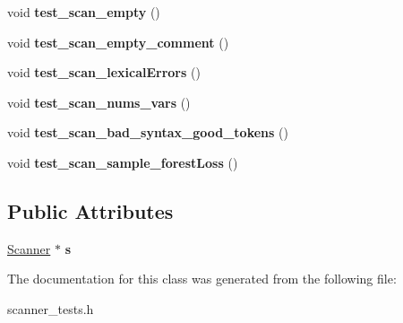 \begin{DoxyCompactItemize}
\item 
\hypertarget{classScannerTestSuite_a01beafb44a33f4d80baf9a4208919c07}{void {\bfseries test\-\_\-scan\-\_\-empty} ()}\label{classScannerTestSuite_a01beafb44a33f4d80baf9a4208919c07}

\item 
\hypertarget{classScannerTestSuite_a304719dd961df0714d372010cdf99ef1}{void {\bfseries test\-\_\-scan\-\_\-empty\-\_\-comment} ()}\label{classScannerTestSuite_a304719dd961df0714d372010cdf99ef1}

\item 
\hypertarget{classScannerTestSuite_af85168e66ba2b924488aca9768231367}{void {\bfseries test\-\_\-scan\-\_\-lexical\-Errors} ()}\label{classScannerTestSuite_af85168e66ba2b924488aca9768231367}

\item 
\hypertarget{classScannerTestSuite_a4bd4d5fc2218f3d28b08b2821ecc271b}{void {\bfseries test\-\_\-scan\-\_\-nums\-\_\-vars} ()}\label{classScannerTestSuite_a4bd4d5fc2218f3d28b08b2821ecc271b}

\item 
\hypertarget{classScannerTestSuite_aad7648d262ef3c103f0792ef73aa3bd8}{void {\bfseries test\-\_\-scan\-\_\-bad\-\_\-syntax\-\_\-good\-\_\-tokens} ()}\label{classScannerTestSuite_aad7648d262ef3c103f0792ef73aa3bd8}

\item 
\hypertarget{classScannerTestSuite_a8248f8bda6c9909971ef13f1364ab8f8}{void {\bfseries test\-\_\-scan\-\_\-sample\-\_\-forest\-Loss} ()}\label{classScannerTestSuite_a8248f8bda6c9909971ef13f1364ab8f8}

\end{DoxyCompactItemize}
\subsection*{Public Attributes}
\begin{DoxyCompactItemize}
\item 
\hypertarget{classScannerTestSuite_a39987f3459098101d7c7fb5a4492996d}{\hyperlink{classScanner}{Scanner} $\ast$ {\bfseries s}}\label{classScannerTestSuite_a39987f3459098101d7c7fb5a4492996d}

\end{DoxyCompactItemize}


The documentation for this class was generated from the following file\-:\begin{DoxyCompactItemize}
\item 
scanner\-\_\-tests.\-h\end{DoxyCompactItemize}
